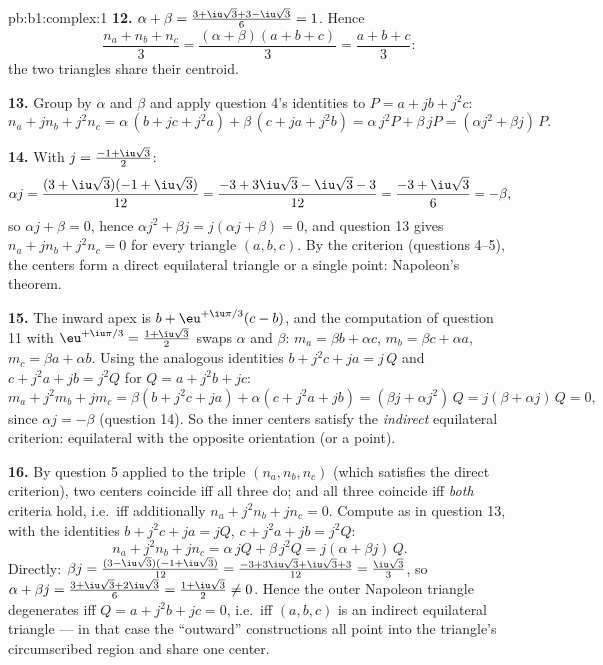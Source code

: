 \begin{solution}{pb:b1:complex:1}
\textbf{12.} $\alpha + \beta = \frac{3 + \iu\sqrt3 + 3 -
\iu\sqrt3}6 = 1$. Hence
\[
\frac{n_a + n_b + n_c}3
= \frac{(\alpha + \beta)(a + b + c)}3 = \frac{a + b + c}3 :
\]
the two triangles share their centroid.

\textbf{13.} Group by $\alpha$ and $\beta$ and apply question 4's
identities to $P = a + jb + j^2c$:
\[
n_a + j n_b + j^2 n_c
= \alpha\,(b + jc + j^2 a) + \beta\,(c + ja + j^2 b)
= \alpha\,j^2 P + \beta\,j P
= (\alpha j^2 + \beta j)\,P .
\]

\textbf{14.} With $j = \frac{-1 + \iu\sqrt3}2$:
\[
\alpha j = \frac{(3 + \iu\sqrt3)(-1 + \iu\sqrt3)}{12}
= \frac{-3 + 3\iu\sqrt3 - \iu\sqrt3 - 3}{12}
= \frac{-3 + \iu\sqrt3}6 = -\beta ,
\]
so $\alpha j + \beta = 0$, hence $\alpha j^2 + \beta j = j(\alpha j
+ \beta) = 0$, and question 13 gives $n_a + jn_b + j^2n_c = 0$ for
every triangle $(a, b, c)$. By the criterion (questions 4--5), the
centers form a direct equilateral triangle or a single point:
Napoleon's theorem.

\textbf{15.} The inward apex is $b + \eu^{+\iu\pi/3}(c - b)$, and
the computation of question 11 with $\eu^{+\iu\pi/3} = \frac{1 +
\iu\sqrt3}2$ swaps $\alpha$ and $\beta$: $m_a = \beta b + \alpha
c$, $m_b = \beta c + \alpha a$, $m_c = \beta a + \alpha b$. Using
the analogous identities $b + j^2c + ja = j\,Q$ and $c + j^2a + jb
= j^2 Q$ for $Q = a + j^2b + jc$:
\[
m_a + j^2 m_b + j m_c
= \beta(b + j^2 c + ja) + \alpha(c + j^2 a + jb)
= (\beta j + \alpha j^2)\, Q = j(\beta + \alpha j)\,Q = 0 ,
\]
since $\alpha j = -\beta$ (question 14). So the inner centers
satisfy the \emph{indirect} equilateral criterion: equilateral with
the opposite orientation (or a point).

\textbf{16.} By question 5 applied to the triple $(n_a, n_b, n_c)$
(which satisfies the direct criterion), two centers coincide iff
all three do; and all three coincide iff \emph{both} criteria hold,
i.e.\ iff additionally $n_a + j^2 n_b + j n_c = 0$. Compute as in
question 13, with the identities $b + j^2c + ja = jQ$, $c + j^2a +
jb = j^2Q$:
\[
n_a + j^2 n_b + j n_c
= \alpha\,jQ + \beta\,j^2 Q = j(\alpha + \beta j)\,Q .
\]
Directly: $\beta j = \frac{(3 -
\iu\sqrt3)(-1 + \iu\sqrt3)}{12} = \frac{-3 + 3\iu\sqrt3 +
\iu\sqrt3 + 3}{12} = \frac{\iu\sqrt3}3$, so $\alpha + \beta j =
\frac{3 + \iu\sqrt3 + 2\iu\sqrt3}6 = \frac{1 + \iu\sqrt3}2 \neq
0$. Hence the outer Napoleon triangle degenerates iff $Q = a +
j^2b + jc = 0$, i.e.\ iff $(a, b, c)$ is an indirect equilateral
triangle --- in that case the ``outward'' constructions all point
into the triangle's circumscribed region and share one center.


\end{solution}
